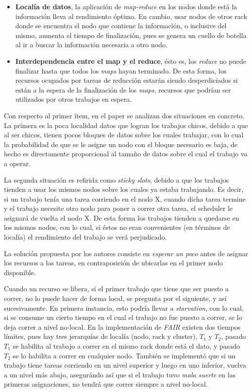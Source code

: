 \documentclass[a4paper]{article}
\begin{document}
\begin{itemize}
  \item \textbf{Localía de datos}, la aplicación de \textit{map-reduce} en los
  nodos donde está la información lleva al rendimiento óptimo. En cambio, usar
  nodos de otros rack donde se encuentra el nodo que contiene la información,
  o inclusive del mismo, aumenta el tiempo de finalización, pues se genera un
  cuello de botella al ir a buscar la información necesaria a otro nodo.
  \item \textbf{Interdependencia entre el map y el reduce}, ésto es, los
  \textit{reduce} no puede finalizar hasta que todos los \textit{maps} hayan
  terminado. De esta forma, los recursos ocupados por tareas de reducción
  estarán siendo desperdiciados si están a la espera de la finalización de los
  \textit{maps}, recursos que podrían ser utilizados por otros trabajos en
  espera.
\end{itemize}

Con respecto al primer ítem, en el paper se analizan dos situaciones en
concreto. La primera es la poca localidad datos que logran los trabajos 
chicos, debido a que al ser chicos, tienen pocos bloques de datos sobre los
cuales trabajar, con lo cual la probabilidad de que se le asigne un nodo con el
bloque necesario es baja, de hecho es directamente proporcional al tamaño de
datos sobre el cual el trabajo va a operar.

La segunda situación es refirida como \textit{sticky slots}, debido a que los
trabajos tienden a usar los mismos nodos sobre los cuales ya estaba trabajando.
Es decir, si un trabajo tenía una tarea corriendo en el nodo X, cuando dicha
tarea termine y el trabajo necesite otro nodo para poner a correr otra tarea,
el scheduler le asignará de vuelta el nodo X. De esta forma los trabajos
tienden a quedarse en los mismos nodos, con lo cual, si éstos no eran
convenientes (en términos de localía) el rendimiento del trabajo se verá
perjudicado.

La solución propuesta por los autores consiste en \textit{esperar un poco}
antes de asignar los recursos a las tareas, en contraposición de ubicarlas en
el primer nodo disponible.

Cuando un recurso se libera, si el primer trabajo que tiene que ser puesto a
correr, no lo puede hacer de forma local, se pregunta por el siguiente, y así
sucesivamente. En primera instancia, esto podría llevar a \textit{starvation},
con lo cual, si se consume un cierto tiempo en el cual el trabajo no
fue puesto a correr, se lo deja correr a nivel no-local. En la implementación
de \textit{FAIR} existen dos tiempos límites, pues hay tres jerarquías de
localía (nodo, rack y cluster), $T_1$ y $T_2$, pasado $T_1$ se habilita al
trabajo a correr en el mismo rack donde está el dato, y pasado $T_2$ se lo
habilita a correr en cualquier nodo. También se implementó que si un trabajo
tiene tareas corriendo en un nivel superior y luego en uno inferior, vuelva a
un nivel más abajo, asegurándo así que si el trabajo tuvo \textit{mala suerte}
en las primeras asignaciones, no tendrá que correr siempre a nivel no-local.
\end{document}
